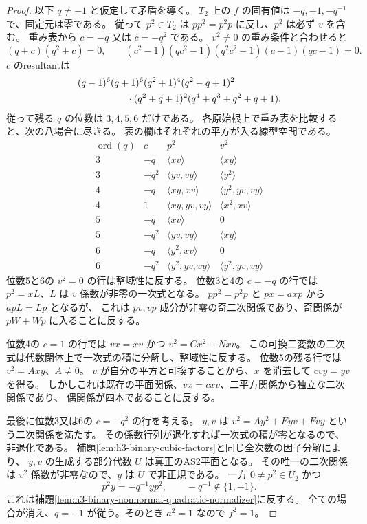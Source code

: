 \begin{proof}
以下 $q\ne-1$ と仮定して矛盾を導く。
$T_2$ 上の $f$ の固有値は $-q,-1,-q^{-1}$ で、固定元は零である。
従って $p^2\in T_2$ は $pp^2=p^2p$ に反し、$p^2$ は必ず $v$ を含む。
重み表から $c=-q$ 又は $c=-q^2$ である。
$v^2\ne0$ の重み条件と合わせると
\[
 (q+c)(q^2+c)=0,\qquad
 (c^2-1)(qc^2-1)(q^2c^2-1)(c-1)(qc-1)=0.
\]
$c$ のresultantは
\begin{align*}
 &(q-1)^6(q+1)^6(q^2+1)^4(q^2-q+1)^2\\
 &\hspace{18mm}\cdot(q^2+q+1)^2(q^4+q^3+q^2+q+1).
\end{align*}
従って残る $q$ の位数は $3,4,5,6$ だけである。
各原始根上で重み表を比較すると、次の八場合に尽きる。
表の欄はそれぞれの平方が入る線型空間である。
\[
\begin{array}{c|c|c|c}
 \operatorname{ord}(q)&c&p^2&v^2\\\hline
 3&-q&\langle xv\rangle&\langle xy\rangle\\
 3&-q^2&\langle yv,vy\rangle&\langle y^2\rangle\\
 4&-q&\langle xy,xv\rangle&\langle y^2,yv,vy\rangle\\
 4&1&\langle xy,yv,vy\rangle&\langle x^2,xv\rangle\\
 5&-q&\langle xv\rangle&0\\
 5&-q^2&\langle yv,vy\rangle&\langle xy\rangle\\
 6&-q&\langle y^2,xv\rangle&0\\
 6&-q^2&\langle y^2,yv,vy\rangle&\langle y^2,yv,vy\rangle
\end{array}
\]
位数5と6の $v^2=0$ の行は整域性に反する。
位数3と4の $c=-q$ の行では $p^2=xL$、$L$ は $v$ 係数が非零の一次式となる。
$pp^2=p^2p$ と $px=axp$ から $apL=Lp$ となるが、
これは $pv,vp$ 成分が非零の奇二次関係であり、奇関係が $pW+Wp$ に入ることに反する。

位数4の $c=1$ の行では $vx=xv$ かつ $v^2=Cx^2+Nxv$。
この可換二変数の二次式は代数閉体上で一次式の積に分解し、整域性に反する。
位数5の残る行では $v^2=Axy$、$A\ne0$。
$v$ が自分の平方と可換することから、$x$ を消去して $cvy=yv$ を得る。
しかしこれは既存の平面関係、$vx=cxv$、二平方関係から独立な二次関係であり、
偶関係が四本であることに反する。

最後に位数3又は6の $c=-q^2$ の行を考える。
$y,v$ は $v^2=A y^2+Eyv+Fvy$ という二次関係を満たす。
その係数行列が退化すれば一次式の積が零となるので、非退化である。
補題\ref{lem:h3-binary-cubic-factors}と同じ全次数の因子分解により、
$y,v$ の生成する部分代数 $U$ は真正のAS2平面となる。
その唯一の二次関係は $v^2$ 係数が非零なので、$y$ は $U$ で非正規である。
一方 $0\ne p^2\in U_2$ かつ
\[
 p^2y=-q^{-1}yp^2,\qquad -q^{-1}\notin\{1,-1\}.
\]
これは補題\ref{lem:h3-binary-nonnormal-quadratic-normalizer}に反する。
全ての場合が消え、$q=-1$ が従う。そのとき $a^2=1$ なので $f^2=1$。


\end{proof}
